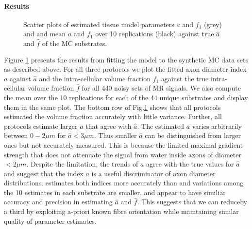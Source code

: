 \paragraph{Results}
\begin{figure}
\centering
	
	
	
	
	  
	
  \caption{Scatter plots of estimated tissue model parameters $a$ and $f_1$ (grey) and and mean $a$ and $f_1$ over 10 replications (black) against true $\hat{a}$ and $\hat{f}$ of the MC substrates.}
  \label{fig:experiment4:mc simulations}
\end{figure}
Figure \ref{fig:experiment4:mc simulations} presents the results from fitting the model to the synthetic MC data sets as described above. For all three protocols we plot the fitted axon diameter index $a$ against $\hat{a}$
and the intra-cellular volume fraction $f_1$ against the true intra-cellular volume fraction $\hat{f}$ for all 440 noisy sets of MR signals. We also compute the mean over the 10 replications for each of the 44
unique substrates and display them in the same plot. The bottom row of Fig.\ref{fig:experiment4:mc simulations} shows that all protocols estimated the volume fraction accurately with little variance. Further, all protocols
estimate larger $a$ that agree with $\hat{a}$. The estimated $a$ varies arbitrarily between $0-2\mu m$ for $\hat{a} < 3\mu m$. Thus smaller $\hat{a}$ can be distinguished from larger ones but not accurately
measured. This is because the limited maximal gradient strength that does not attenuate the signal from water inside axons of diameter $<2\mu m$. Despite the limitation, the trends of $a$ agree with the true
values for $\hat{a}$ and suggest that the index $a$ is a useful discriminator of axon diameter distributions. \SFlong{} estimates both indices more accurately than \OIlong{} and variations among the 10
estimates in each substrate are smaller. \SFshort{} and \OIlong{} appear to have similiar accuracy and precision in estimating $\hat{a}$ and $\hat{f}$. This suggests that we can reduceby a third by exploiting
a-priori known fibre orientation while maintaining similar quality of parameter estimates.


